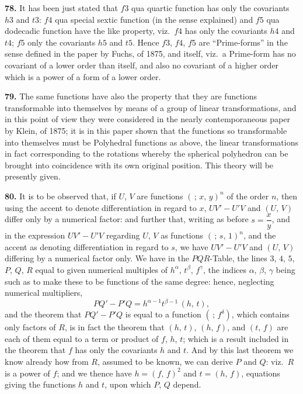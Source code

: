\documentclass[11pt,a4paper]{article}
\newcommand{\artno}[1]{\textbf{#1.}\quad}
\begin{document}
\artno{78} It has been just stated that $f3$ qua quartic function has only
the covariants $h3$ and $t3$: $f4$ qua special sextic function (in the sense
explained) and $f5$ qua dodecadic function have the like property, viz.\
$f4$ has only the covariants $h4$ and $t4$; $f5$ only the covariants $h5$
and $t5$. Hence $f3$, $f4$, $f5$ are ``Prime-forms'' in the sense defined in
the paper by Fuchs, of 1875, and itself, viz.\ a Prime-form has no covariant
of a lower order than itself, and also no covariant of a higher order which
is a power of a form of a lower order.

\artno{79} The same functions have also the property that they are functions
transformable into themselves by means of a group of linear transformations,
and in this point of view they were considered in the nearly contemporaneous
paper by Klein, of 1875; it is in this paper shown that the functions so
transformable into themselves must be Polyhedral functions as above, the
linear transformations in fact corresponding to the rotations whereby the
spherical polyhedron can be brought into coincidence with its own original
position. This theory will be presently given.

\artno{80} It is to be observed that, if $U$, $V$ are functions
$(\,;\,x,\,y)^{n}$ of the order $n$, then using the accent to denote
differentiation in regard to $x$, $UV' - U'V$ and $(U,\,V)$ differ only by
a numerical factor: and further that, writing as before $s = \dfrac{x}{y}$,
and in the expression $UV' - U'V$ regarding $U$, $V$ as functions
$(\,;\,s,\,1)^{n}$, and the accent as denoting differentiation in regard
to $s$, we have $UV' - U'V$ and $(U,\,V)$ differing by a numerical factor
only. We have in the $PQR$-Table, the lines $3$, $4$, $5$, $P$, $Q$, $R$
equal to given numerical multiples of $h^{\alpha}$, $t^{\beta}$, $f^{\gamma}$,
the indices $\alpha$, $\beta$, $\gamma$ being such as to make these to be
functions of the same degree: hence, neglecting numerical multipliers,
\[
  PQ' - P'Q = h^{\alpha-1} t^{\beta-1}\,(h,\,t),
\]
and the theorem that $PQ' - P'Q$ is equal to a function $(\,;\,f^{\delta})$,
which contains only factors of $R$, is in fact the theorem that
$(h,\,t)$, $(h,\,f)$, and $(t,\,f)$ are each of them equal to a term or
product of $f$, $h$, $t$; which is a result included in the theorem that $f$
has only the covariants $h$ and $t$. And by this last theorem we know
already how from $R$, assumed to be known, we can derive $P$ and $Q$: viz.\
$R$ is a power of $f$; and we thence have $h = (f,\,f)^{2}$ and $t = (h,\,f)$,
equations giving the functions $h$ and $t$, upon which $P$, $Q$ depend.
\end{document}
